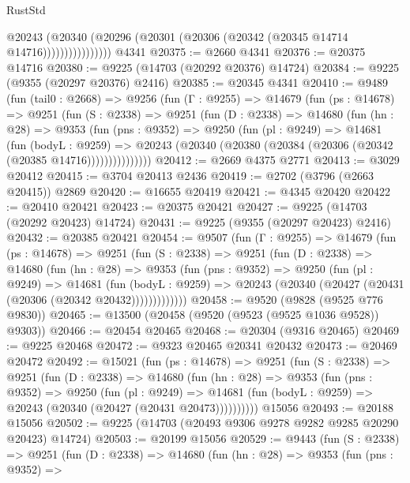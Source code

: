 \begin{lexlean}{RustStd}
\begin{coremodule}
                      @20243
                        (@20340
                          (@20296 (@20301 (@20306 (@20342 (@20345 @14714 @14716))))))))))))))))
    @4341
@20375 := @2660 @4341
@20376 := @20375 @14716
@20380 := @9225 (@14703 (@20292 @20376) @14724)
@20384 := @9225 (@9355 (@20297 @20376) @2416)
@20385 := @20345 @4341
@20410 := @9489
    (fun (tail0 : @2668) =>
    @9256
      (fun (Γ : @9255) =>
      @14679
        (fun (ps : @14678) =>
        @9251
          (fun (S : @2338) =>
          @9251
            (fun (D : @2338) =>
            @14680
              (fun (hn : @28) =>
              @9353
                (fun (pns : @9352) =>
                @9250
                  (fun (pl : @9249) =>
                  @14681
                    (fun (bodyL : @9259) =>
                    @20243 (@20340 (@20380 (@20384 (@20306 (@20342 (@20385 @14716)))))))))))))))
@20412 := @2669 @4375 @2771
@20413 := @3029 @20412
@20415 := @3704 @20413 @2436
@20419 := @2702 (@3796 (@2663 @20415)) @2869
@20420 := @16655 @20419
@20421 := @4345 @20420
@20422 := @20410 @20421
@20423 := @20375 @20421
@20427 := @9225 (@14703 (@20292 @20423) @14724)
@20431 := @9225 (@9355 (@20297 @20423) @2416)
@20432 := @20385 @20421
@20454 := @9507
    (fun (Γ : @9255) =>
    @14679
      (fun (ps : @14678) =>
      @9251
        (fun (S : @2338) =>
        @9251
          (fun (D : @2338) =>
          @14680
            (fun (hn : @28) =>
            @9353
              (fun (pns : @9352) =>
              @9250
                (fun (pl : @9249) =>
                @14681
                  (fun (bodyL : @9259) =>
                  @20243 (@20340 (@20427 (@20431 (@20306 (@20342 @20432)))))))))))))
@20458 := @9520 (@9828 (@9525 @776 @9830))
@20465 := @13500 (@20458 (@9520 (@9523 (@9525 @1036 @9528)) @9303))
@20466 := @20454 @20465
@20468 := @20304 (@9316 @20465)
@20469 := @9225 @20468
@20472 := @9323 @20465 @20341 @20432
@20473 := @20469 @20472
@20492 := @15021
    (fun (ps : @14678) =>
    @9251
      (fun (S : @2338) =>
      @9251
        (fun (D : @2338) =>
        @14680
          (fun (hn : @28) =>
          @9353
            (fun (pns : @9352) =>
            @9250
              (fun (pl : @9249) =>
              @14681 (fun (bodyL : @9259) => @20243 (@20340 (@20427 (@20431 @20473))))))))))
    @15056
@20493 := @20188 @15056
@20502 := @9225 (@14703 (@20493 @9306 @9278 @9282 @9285 @20290 @20423) @14724)
@20503 := @20199 @15056
@20529 := @9443
    (fun (S : @2338) =>
    @9251
      (fun (D : @2338) =>
      @14680
        (fun (hn : @28) =>
        @9353
          (fun (pns : @9352) =>

\end{coremodule}
\end{lexlean}
